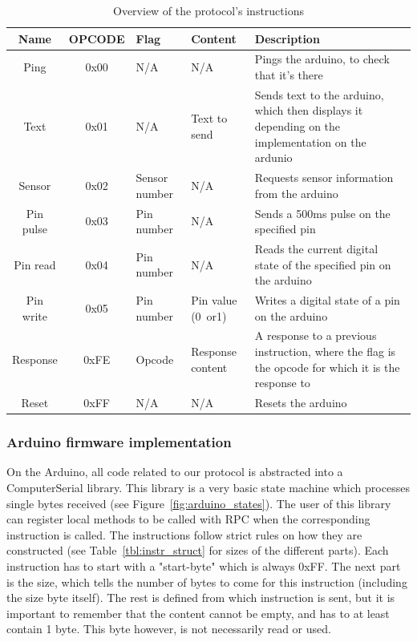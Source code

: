 \begin{table}[h!]
\begin{tabular}{ | c | c | p{1.5cm} | p{1.7cm} | p{6cm} |}
\hline
\textbf{Name} & \textbf{OPCODE} & \textbf{Flag} & \textbf{Content} & \textbf{Description} \\
\hline
Ping & 0x00 & N/A & N/A & Pings the arduino, to check that it's there \\
\hline
Text & 0x01 & N/A & Text to send & Sends text to the arduino, which then displays it depending on the implementation on the ardunio \\
\hline
Sensor & 0x02 & Sensor number & N/A & Requests sensor information from the arduino \\
\hline
Pin pulse & 0x03 & Pin number & N/A & Sends a 500ms pulse on the specified pin \\
\hline
Pin read & 0x04 & Pin number & N/A & Reads the current digital state of the specified pin on the arduino \\
\hline
Pin write & 0x05 & Pin number & Pin value (0~or1) & Writes a digital state of a pin on the arduino \\
\hline
Response & 0xFE & Opcode & Response content & A response to a previous instruction, where the flag is the opcode for which it is the response to \\
\hline
Reset & 0xFF & N/A & N/A & Resets the arduino \\
\hline
\end{tabular}
\caption{Overview of the protocol's instructions}
\label{tbl:opcodes}
\end{table}

\subsubsection{Arduino firmware implementation}
On the Arduino, all code related to our protocol is abstracted into a ComputerSerial library.
This library is a very basic state machine which processes single bytes received (see Figure~\ref{fig:arduino_states}).
The user of this library can register local methods to be called with RPC when the corresponding instruction is called.
The instructions follow strict rules on how they are constructed (see Table~\ref{tbl:instr_struct} for sizes of the different parts).
Each instruction has to start with a "start-byte" which is always 0xFF. The next part is the size, which tells the number of bytes
to come for this instruction (including the size byte itself). The rest is defined from which instruction is sent, but it is important to
remember that the content cannot be empty, and has to at least contain 1 byte. This byte however, is not necessarily read or used.

